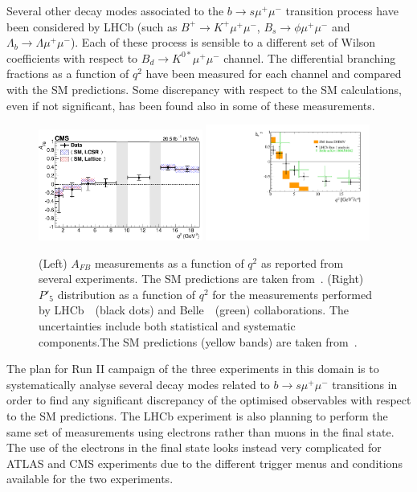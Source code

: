 Several other decay modes associated to the $b \to s \mu^+ \mu^-$ transition process have been considered by LHCb (such as $B^+ \to K^{+} \mu^+ \mu^-$, $B_s \to  \phi \mu^+ \mu^-$ and $\Lambda_b \to \Lambda \mu^+ \mu^-$). Each of these process is sensible to a different set of Wilson coefficients with respect to $B_d \to  K^{0*} \mu^+ \mu^-$ channel. The differential branching fractions as a function of $q^2$ have been measured for each channel and compared with the SM predictions. Some discrepancy with respect to the SM calculations, even if not significant, has been found also in some of these measurements.\\
\begin{figure}[!t]
  \begin{center}
  \includegraphics[width=0.48\textwidth]{AFB_CMS.png}
  \includegraphics[width=0.48\textwidth]{P5p.pdf}
    \caption {(Left) $A_{FB}$ measurements as a function of $q^2$ as reported from several experiments. The SM predictions are taken from~\cite{ABSZ}. (Right) $P'_5$ distribution as a function of $q^2$ for the measurements performed by LHCb~\cite{mumuK_LHCb}~(black dots) and Belle~\cite{Belle}~(green) collaborations. The uncertainties include both statistical and systematic components.The SM predictions (yellow bands) are taken from~\cite{DHMV}. }
        \label{fig:mumuK}
  \end{center}
\end{figure}
The plan for Run II campaign of the three experiments in this domain is to systematically analyse several decay modes related to $b \to s \mu^+ \mu^-$  transitions in order to find any significant discrepancy of the optimised observables with respect to the SM predictions. The LHCb experiment is also planning to perform the same set of measurements using electrons rather than muons in the final state. The use of the electrons in the final state looks instead very complicated for ATLAS and CMS experiments due to the different trigger menus and conditions available for the two experiments.

